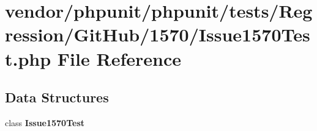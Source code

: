 \section{vendor/phpunit/phpunit/tests/\+Regression/\+Git\+Hub/1570/\+Issue1570\+Test.php File Reference}
\label{_issue1570_test_8php}
\subsection*{Data Structures}
\begin{DoxyCompactItemize}
\item 
class {\bf Issue1570\+Test}
\end{DoxyCompactItemize}
